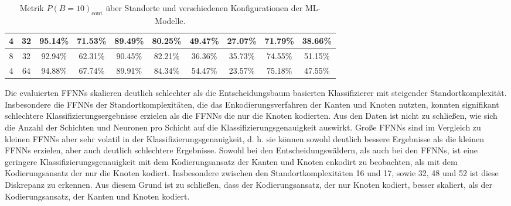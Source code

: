 \begin{table}[h!]
\begin{tabular}{ | c | c | c | c | c | c | c | c | c | c | }
        4 & 32 & 95.14\% & 71.53\% & 89.49\% & 80.25\% & 49.47\% & 27.07\% & 71.79\% & 38.66\% \\\hline
        8 & 32 & 92.94\% & 62.31\% & 90.45\% & 82.21\% & 36.36\% & 35.73\% & 74.55\% & 51.15\% \\\hline
        4 & 64 & 94.88\% & 67.74\% & 89.91\% & 84.34\% & 54.47\% & 23.57\% & 75.18\% & 47.55\% \\\hline
    \end{tabular}
    \caption{Metrik $P(B=10)_{\text{cont}}$ über Standorte und verschiedenen Konfigurationen der ML-Modelle.}
    \label{tab:predictions_by_acc_10_cont}
\end{table}
\newline
\newline
Die evaluierten FFNNs skalieren deutlich schlechter als die Entscheidungsbaum basierten Klassifizierer mit steigender Standortkomplexität.
Insbesondere die FFNNs der Standortkomplexitäten, die das Enkodierungsverfahren der Kanten und Knoten nutzten,
konnten signifikant schlechtere Klassifizierungsergebnisse erzielen als die FFNNs die nur die Knoten kodierten.
Aus den Daten ist nicht zu schließen, wie sich die Anzahl der Schichten und Neuronen pro Schicht auf die Klassifizierungsgenauigkeit auswirkt.
Große FFNNs sind im Vergleich zu kleinen FFNNs aber sehr volatil in der Klassifizierungsgenauigkeit,
d. h. sie können sowohl deutlich bessere Ergebnisse als die kleinen FFNNs erzielen, aber auch deutlich schlechtere Ergebnisse.
\newline
\newline
Sowohl bei den Entscheidungswäldern, als auch bei den FFNNs, ist eine geringere Klassifizierungsgenauigkeit mit dem Kodierungsansatz der Kanten und Knoten enkodirt
zu beobachten, als mit dem Kodierungsansatz der nur die Knoten kodiert.
Insbesondere zwischen den Standortkomplexitäten 16 und 17, sowie 32, 48 und 52 ist diese Diskrepanz zu erkennen.
Aus diesem Grund ist zu schließen, dass der Kodierungsansatz, der nur Knoten kodiert, besser skaliert, als der Kodierungsansatz, der Kanten und Knoten kodiert.